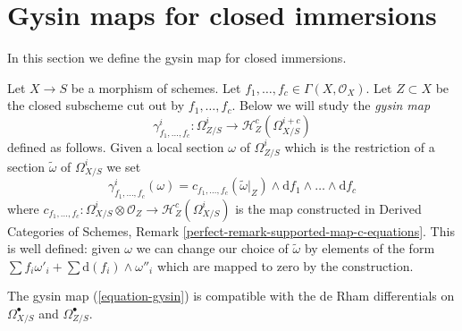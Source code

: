 \section{Gysin maps for closed immersions}
\label{section-gysin}

\noindent
In this section we define the gysin map for closed immersions.

\begin{remark}
\label{remark-gysin-equations}
Let $X \to S$ be a morphism of schemes. Let
$f_1, \ldots, f_c \in \Gamma(X, \mathcal{O}_X)$. Let $Z \subset X$
be the closed subscheme cut out by $f_1, \ldots, f_c$. Below we will
study the {\it gysin map}
\begin{equation}
\label{equation-gysin}
\gamma^i_{f_1, \ldots, f_c} :
\Omega^i_{Z/S}
\longrightarrow
\mathcal{H}_Z^c(\Omega^{i + c}_{X/S})
\end{equation}
defined as follows. Given a local section $\omega$ of $\Omega^i_{Z/S}$
which is the restriction of a section $\tilde \omega$ of $\Omega^i_{X/S}$
we set
$$
\gamma^i_{f_1, \ldots, f_c}(\omega) =
c_{f_1, \ldots, f_c}(\tilde \omega|_Z) \wedge
\text{d}f_1 \wedge \ldots \wedge \text{d}f_c
$$
where $c_{f_1, \ldots, f_c} : \Omega^i_{X/S} \otimes \mathcal{O}_Z \to
\mathcal{H}_Z^c(\Omega^i_{X/S})$ is the map constructed in
Derived Categories of Schemes, Remark
\ref{perfect-remark-supported-map-c-equations}.
This is well defined: given $\omega$ we can change our choice of
$\tilde \omega$ by elements of the form
$\sum f_i \omega'_i + \sum \text{d}(f_i) \wedge \omega''_i$
which are mapped to zero by the construction.
\end{remark}

\begin{lemma}
\label{lemma-gysin-differential}
The gysin map (\ref{equation-gysin}) is compatible with the de Rham
differentials on $\Omega^\bullet_{X/S}$ and $\Omega^\bullet_{Z/S}$.
\end{lemma}

